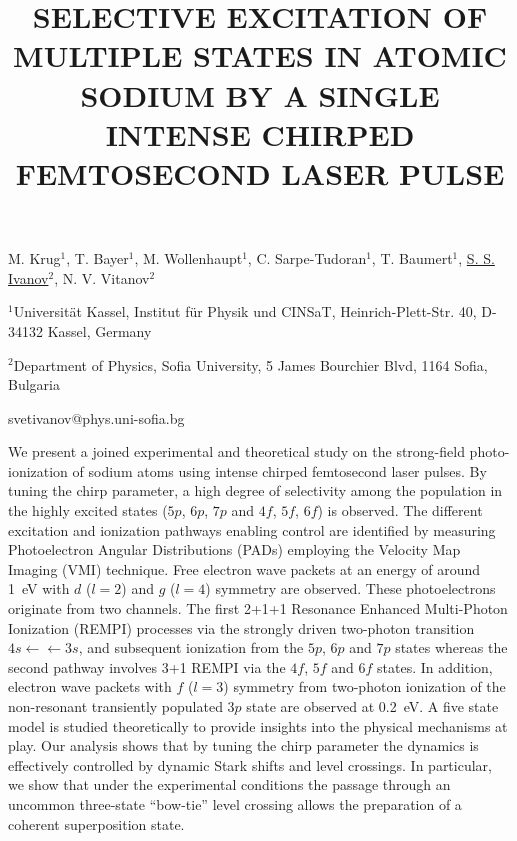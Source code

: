 \title{SELECTIVE EXCITATION OF MULTIPLE STATES IN ATOMIC SODIUM BY A SINGLE INTENSE CHIRPED FEMTOSECOND LASER PULSE}

M. Krug$^1$, T. Bayer$^1$, M. Wollenhaupt$^1$, C. Sarpe-Tudoran$^1$, T. Baumert$^1$,
\underline{S. S. Ivanov}$^2$, N. V. Vitanov$^{2}$ 
  
 

{\normalsize{\vspace{-4mm}
$^1$Universit\"at Kassel, Institut f\"ur Physik und CINSaT,
Heinrich-Plett-Str. 40, D-34132 Kassel, Germany

\vspace{-4mm} $^2$Department of Physics, Sofia University, 5 James
Bourchier Blvd, 1164 Sofia, Bulgaria

\email svetivanov@phys.uni-sofia.bg}}

We present a joined experimental and theoretical study on the
strong-field photo-ionization of sodium atoms using intense chirped
femtosecond laser pulses. By tuning the chirp parameter, a high
degree of selectivity among the population in the highly excited
states ($5p$, $6p$, $7p$ and $4f$, $5f$, $6f$) is observed. The
different excitation and ionization pathways enabling control are
identified by measuring Photoelectron Angular Distributions (PADs)
employing the Velocity Map Imaging (VMI) technique.  Free electron
wave packets at an energy of around 1~eV with $d$ ($l=2$) and $g$
($l=4$) symmetry are observed. These photoelectrons originate from
two channels. The first 2+1+1 Resonance Enhanced Multi-Photon
Ionization (REMPI) processes via the strongly driven two-photon
transition $4s \leftarrow\leftarrow3s$, and subsequent
ionization from the $5p$, $6p$ and $7p$ states whereas the second pathway
involves 3+1 REMPI via the $4f$, $5f$ and $6f$ states. In addition,
electron wave packets with $f$ ($l=3$) symmetry from two-photon
ionization of the non-resonant transiently populated $3p$ state are
observed at 0.2~eV. A five state model is studied theoretically to
provide insights into the physical mechanisms at play. Our analysis
shows that by tuning the chirp parameter the dynamics is effectively
controlled by dynamic Stark shifts and level crossings.  In
particular, we show that under the experimental conditions the
passage through an uncommon three-state ``bow-tie'' level
crossing allows the preparation of a coherent superposition state.

\vspace{\baselineskip}